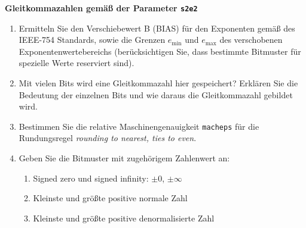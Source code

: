 	\textbf{Gleitkommazahlen gemäß der Parameter \texttt{s2e2}}
	\begin{enumerate}
		\item Ermitteln Sie den Verschiebewert B (BIAS) für den Exponenten gemäß des IEEE-754 Standards, sowie die Grenzen $e_{\text{min}}$ und $e_{\text{max}}$ des verschobenen Exponentenwertebereichs  (berücksichtigen Sie, dass bestimmte Bitmuster für spezielle Werte reserviert sind).
		\item Mit vielen Bits wird eine Gleitkommazahl hier gespeichert? Erklären Sie die Bedeutung der einzelnen Bits und wie daraus die Gleitkommazahl gebildet wird.
	\item Bestimmen Sie die relative Maschinengenauigkeit \texttt{macheps} für die Rundungsregel \textit{rounding to nearest, ties to even}.
\item Geben Sie die Bitmuster mit zugehörigem Zahlenwert an:
\begin{enumerate}
	\item Signed zero und signed infinity:  $\pm 0$, $\pm \infty$
	\item Kleinste und größte positive normale Zahl
	\item Kleinste und größte positive denormalisierte Zahl
\end{enumerate}
	\end{enumerate}

